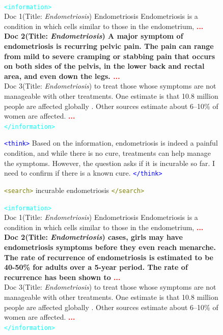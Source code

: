 \begin{figure}[h]
\begin{tcolorbox}[colback=white,colframe=black!60,title=\textbf{Question:} What is the painful and incurable so far condition characterised by uterine cells growing outside the uterus?]
\\
\vspace{0.5em}
\textcolor{cyan}{\texttt{<information>}}\\
Doc 1(Title: \textit{Endometriosis}) Endometriosis Endometriosis is a condition in which cells similar to those in the endometrium,  \textcolor{red}{\textbf{...}}\\
\textbf{Doc 2(Title: \textit{Endometriosis}) A major symptom of endometriosis is recurring pelvic pain. The pain can range from mild to severe cramping or stabbing pain that occurs on both sides of the pelvis, in the lower back and rectal area, and even down the legs.  \textcolor{red}{\textbf{...}}}\\
Doc 3(Title: \textit{Endometriosis}) to treat those whose symptoms are not manageable with other treatments. One estimate is that 10.8 million people are affected globally . Other sources estimate about 6–10\% of women are affected. \textcolor{red}{\textbf{...}}\\
\textcolor{cyan}{\texttt{</information>}}

\vspace{0.5em}
\textcolor{blue}{\texttt{<think>}} Based on the information, endometriosis is indeed a painful condition, and while there is no cure, treatments can help manage the symptoms. However, the question asks if it is incurable so far. I need to confirm if there is a known cure.
\textcolor{blue}{\texttt{</think>}}

\vspace{0.5em}
\textcolor{olive}{\texttt{<search>}} incurable endometriosis \textcolor{olive}{\texttt{</search>}}

\vspace{0.5em}
\textcolor{cyan}{\texttt{<information>}}\\
Doc 1(Title: \textit{Endometriosis}) Endometriosis Endometriosis is a condition in which cells similar to those in the endometrium,  \textcolor{red}{\textbf{...}}\\
\textbf{Doc 2(Title: \textit{Endometriosis}) cases, girls may have endometriosis symptoms before they even reach menarche. The rate of recurrence of endometriosis is estimated to be 40-50\% for adults over a 5-year period. The rate of recurrence has been shown to  \textcolor{red}{\textbf{...}}}\\
Doc 3(Title: \textit{Endometriosis}) to treat those whose symptoms are not manageable with other treatments. One estimate is that 10.8 million people are affected globally . Other sources estimate about 6–10\% of women are affected. \textcolor{red}{\textbf{...}}\\
\textcolor{cyan}{\texttt{</information>}}
\vspace{0.5em}


\end{tcolorbox}
\end{figure}

